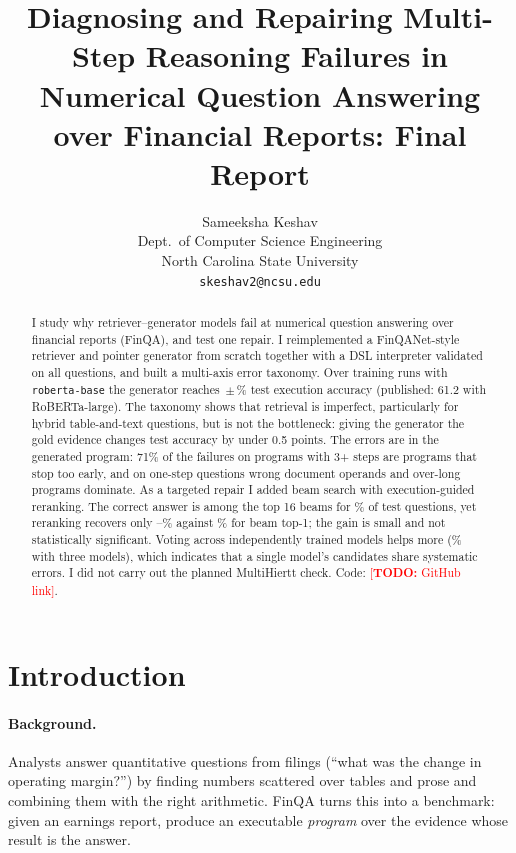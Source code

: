 \documentclass{article}
\title{Diagnosing and Repairing Multi-Step Reasoning Failures in Numerical Question Answering over Financial Reports: Final Report}
\author{
  Sameeksha Keshav \\
  Dept.\ of Computer Science Engineering \\
  North Carolina State University \\
  \texttt{skeshav2@ncsu.edu}
}
\newcommand{\todo}[1]{\textcolor{red}{[\textbf{TODO:} #1]}}
\newcommand{\code}[1]{\texttt{#1}}
\begin{document}
\maketitle

\begin{abstract}
I study why retriever--generator models fail at numerical question answering over financial reports (FinQA), and test one repair. I reimplemented a FinQANet-style retriever and pointer generator from scratch together with a DSL interpreter validated on all \NTotal{} questions, and built a multi-axis error taxonomy. Over \NRuns{} training runs with \code{roberta-base} the generator reaches \SingleEAMean\,$\pm$\,\SingleEASd\% test execution accuracy (published: 61.2 with RoBERTa-large). The taxonomy shows that retrieval is imperfect, particularly for hybrid table-and-text questions, but is not the bottleneck: giving the generator the gold evidence changes test accuracy by under 0.5 points. The errors are in the generated program: 71\% of the failures on programs with 3+ steps are programs that stop too early, and on one-step questions wrong document operands and over-long programs dominate. As a targeted repair I added beam search with execution-guided reranking. The correct answer is among the top 16 beams for \OracleKSixteen\% of test questions, yet reranking recovers only \MargEA--\LearnEA\% against \BeamTopEA\% for beam top-1; the gain is small and not statistically significant. Voting across independently trained models helps more (\VoteThree\% with three models), which indicates that a single model's candidates share systematic errors. I did not carry out the planned MultiHiertt check. Code: \todo{GitHub link}.
\end{abstract}

\section{Introduction}

\paragraph{Background.} Analysts answer quantitative questions from filings (``what was the change in operating margin?'') by finding numbers scattered over tables and prose and combining them with the right arithmetic. FinQA \citep{chen2021finqa} turns this into a benchmark: given an earnings report, produce an executable \emph{program} over the evidence whose result is the answer.
\end{document}
